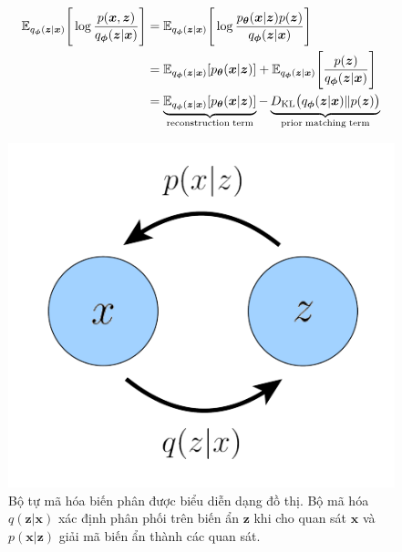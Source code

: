 \documentclass[14pt, a4paper]{article}
\numberwithin{equation}{section}
\numberwithin{figure}{section}
\numberwithin{dl}{section}
\numberwithin{md}{section}
\numberwithin{bd}{section}
\numberwithin{dn}{section}
\numberwithin{hq}{section}
\begin{document}
    \begin{equation} \label{eq:VAEs-Formulation}
        \begin{aligned}
            \mathbb{E}_{q_{\boldsymbol{\phi}} (\boldsymbol{z} \vert \boldsymbol{x})} \Bigg \lbrack \log \dfrac{p(\boldsymbol{x}, \boldsymbol{z})}{q_{\boldsymbol{\phi}} (\boldsymbol{z} \vert \boldsymbol{x})} \Bigg \rbrack &= \mathbb{E}_{q_{\boldsymbol{\phi}} (\boldsymbol{z} \vert \boldsymbol{x})} \Bigg \lbrack \log \dfrac{p_{\boldsymbol{\theta}}(\boldsymbol{x} \vert \boldsymbol{z}) p (\boldsymbol{z})}{q_{\boldsymbol{\phi}} (\boldsymbol{z} \vert \boldsymbol{x})} \Bigg \rbrack \\
            &= \mathbb{E}_{q_{\boldsymbol{\phi}} (\boldsymbol{z} \vert \boldsymbol{x})} \lbrack p_{\boldsymbol{\theta}} (\boldsymbol{x} \vert \boldsymbol{z}) \rbrack + \mathbb{E}_{q_{\boldsymbol{\phi}} (\boldsymbol{z} \vert \boldsymbol{x})} \Bigg \lbrack \dfrac{p(\boldsymbol{z})}{q_{\boldsymbol{\phi}} (\boldsymbol{z} \vert \boldsymbol{x})} \Bigg \rbrack \\
            &= \underbrace{\mathbb{E}_{q_{\boldsymbol{\phi}} (\boldsymbol{z} \vert \boldsymbol{x})} \lbrack p_{\boldsymbol{\theta}} (\boldsymbol{x} \vert \boldsymbol{z}) \rbrack}_{\mathrm{reconstruction \thickspace term}} - \underbrace{D_{\mathrm{KL}} \big( q_{\boldsymbol{\phi}} (\boldsymbol{z} \vert \boldsymbol{x}) \Vert p(\boldsymbol{z}) \big)}_{\mathrm{prior \thickspace matching \thickspace term}}
        \end{aligned}
    \end{equation}

    \begin{figure}[h!]
        \centering
        \includegraphics[scale=0.5]{VAE-Graph.png}
        \caption{Bộ tự mã hóa biến phân được biểu diễn dạng đồ thị.
        Bộ mã hóa $q(\boldsymbol{z} \vert \boldsymbol{x})$ xác định phân phối trên biến ẩn $\boldsymbol{z}$ khi cho quan sát $\boldsymbol{x}$ và $p(\boldsymbol{x} \vert \boldsymbol{z})$ giải mã biến ẩn thành các quan sát.}
        \label{fig:VAE-Graph}
    \end{figure}
\end{document}

